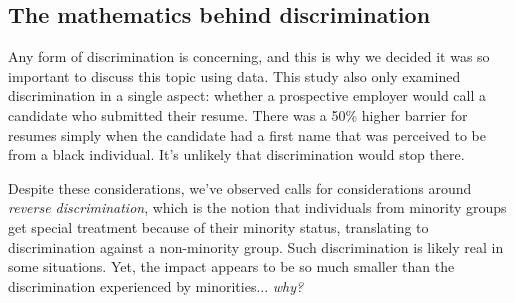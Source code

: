 \subsection{The mathematics behind discrimination}



Any form of discrimination is concerning,
and this is why we decided it was so important to discuss
this topic using data.
This study also only examined discrimination in a
single aspect: whether a prospective employer would
call a candidate who submitted their resume.
There was a 50\% higher barrier for resumes simply when
the candidate had a first name that was perceived to be
from a black individual.
It's unlikely that discrimination would stop there.

Despite these considerations, we've observed calls for
considerations around \emph{reverse discrimination},
%
which is the notion that individuals from minority groups
get special treatment because of their minority status,
translating to discrimination against a non-minority group.
Such discrimination is likely real in some situations.
Yet, the impact appears to be so much smaller than the
discrimination experienced by minorities... \emph{why?}

